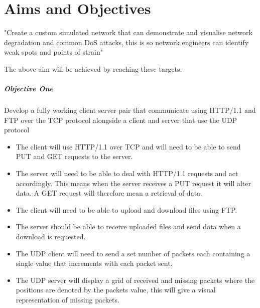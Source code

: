 \chapter{Aims and Objectives}
\begin{center}
"Create a custom simulated network that can demonstrate and visualise network degradation and common DoS attacks, this is so network engineers can identify weak spots and points of strain"
\end{center}


The above aim will be achieved by reaching these targets:

\paragraph{Objective One}
Develop a fully working client server pair that communicate using HTTP/1.1 \citep{HTTP} and FTP over the TCP protocol alongside a client and server that use the UDP protocol

\begin{itemize}
\item The client will use HTTP/1.1  over TCP and will need to be able to send PUT and GET requests to the server.
\item The server will need to be able to deal with HTTP/1.1 requests and act accordingly. This means when the server receives a PUT request it will alter data. A GET request will therefore mean a retrieval of data. 
\item The client will need to be able to upload and download files using FTP.
\item The server should be able to receive uploaded files and send data when a download is requested.
\item The UDP client will need to send a set number of packets each containing a single value that increments with each packet sent.
\item The UDP server will display a grid of received and missing packets where the positions are denoted by the packets value, this will give a visual representation of missing packets.
\end{itemize}  

